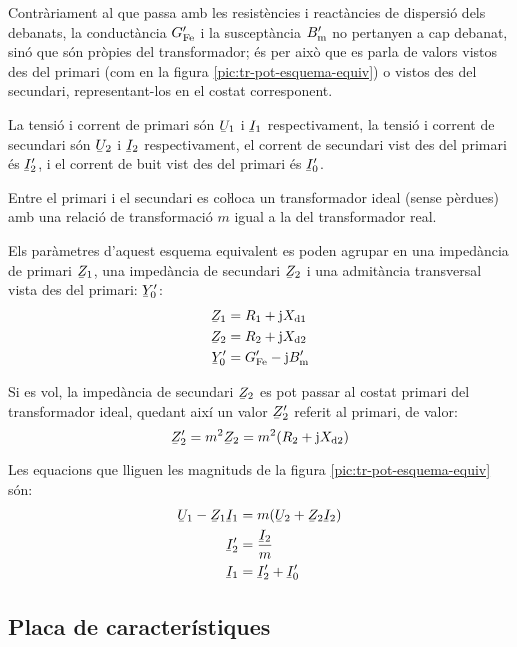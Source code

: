 Contràriament al que passa amb les resistències i reactàncies de dispersió dels debanats, la conductància $G_\mathrm{Fe}'$ i la susceptància $B_\mathrm{m}'$ no pertanyen a cap debanat, sinó que són pròpies del transformador; és per això que es parla de valors vistos des del primari (com en la figura \vref{pic:tr-pot-esquema-equiv}) o vistos des del secundari, representant-los en el costat corresponent.

La tensió i corrent de primari són $\cmplx{U}_1$ i $\cmplx{I}_1$ respectivament, la tensió i corrent de secundari són $\cmplx{U}_2$ i $\cmplx{I}_2$ respectivament, el corrent de secundari vist des del primari és $\cmplx{I}_2'$, i el corrent de buit vist des del primari és $\cmplx{I}_0'$.

Entre el primari i el secundari es coŀloca un transformador ideal (sense pèrdues) amb una relació de transformació $m$ igual a la del transformador real.

Els paràmetres d'aquest esquema equivalent es poden agrupar en una impedància de primari $\cmplx{Z}_1$, una impedància de secundari $\cmplx{Z}_2$ i una  admitància transversal vista des del primari: $\cmplx{Y}_0'$:
\begin{align}
    \cmplx{Z}_1 &= R_1 + \ju X\ped{d1} \\
    \cmplx{Z}_2 &= R_2 + \ju X\ped{d2}\\
    \cmplx{Y}_0' &= G\ped{Fe}'- \ju B\ped{m}'
\end{align}

Si es vol, la impedància de secundari $\cmplx{Z}_2$ es pot passar al costat primari del transformador ideal, quedant així un valor $\cmplx{Z}_2'$ referit al primari, de valor:
\begin{equation}
    \cmplx{Z}_2' = m^2 \cmplx{Z}_2 =  m^2 (R_2 + \ju X\ped{d2})
\end{equation}

Les equacions que lliguen les magnituds de la figura \vref{pic:tr-pot-esquema-equiv} són:
\begin{align}
    \cmplx{U}_1 - \cmplx{Z}_1 \cmplx{I}_1 &= m ( \cmplx{U}_2  + \cmplx{Z}_2 \cmplx{I}_2 ) \\
    \cmplx{I}_2' &=   \frac{\cmplx{I}_2}{m} \\
    \cmplx{I}_1  &=   \cmplx{I}_2' + \cmplx{I}_0'
\end{align}


\subsection{Placa de característiques}

